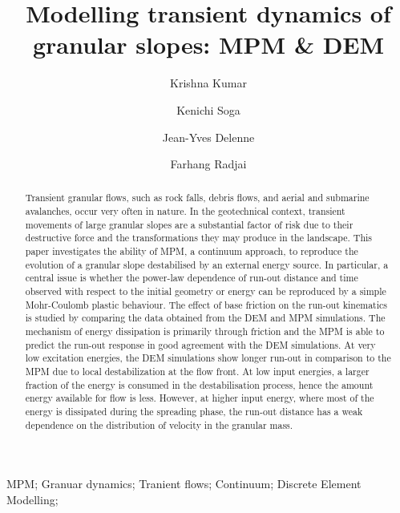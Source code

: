 \documentclass[3p,times,procedia,number]{elsarticle}
\begin{document}
\begin{frontmatter}



\title{Modelling transient dynamics of granular slopes: MPM \& DEM}

\author[a]{Krishna Kumar}
\author[a,b]{Kenichi Soga}
\author[c]{Jean-Yves Delenne}
\author[c,d]{Farhang Radjai}

\address[a]{Department of Engineering, University of Cambridge, Cambridge CB2
  1PZ, UK}
\address[b]{Department of Civil Engineering, University of California,
  Berkeley, USA}
\address[c]{University of Montpellier II, France}
\address[d]{Massachusetts Institute of Technology, Cambridge, USA}

\begin{abstract}
Transient granular flows, such as rock falls, debris flows, and aerial and
submarine avalanches, occur very often in nature. In the geotechnical
context, transient movements of large granular slopes are a substantial
factor of risk due to their destructive force and the transformations they
may produce in the landscape. This paper investigates the ability of MPM, a
continuum approach, to reproduce the evolution of a granular slope
destabilised by an external energy source. In particular, a central issue is
whether the power-law dependence of run-out distance and time observed with
respect to the initial geometry or energy can be reproduced by a simple
Mohr-Coulomb plastic behaviour. The effect of base 
friction on the run-out kinematics is studied by comparing the data obtained
from the DEM and MPM simulations. The mechanism of energy dissipation is
primarily through friction and the MPM is able to predict the run-out response in
good agreement with the DEM simulations. At very low excitation energies, 
the DEM simulations show longer run-out in comparison to the MPM due to local
destabilization at the flow front. At low input energies, a larger fraction of
the energy is consumed in the destabilisation process, hence the amount energy
available for flow is less. However, at higher input energy, where most of
the energy is dissipated during the spreading phase, the run-out distance 
has a weak dependence on the distribution of velocity in the granular mass.
\end{abstract}

\begin{keyword}
MPM; Granuar dynamics; Tranient flows; Continuum; 
Discrete Element Modelling;



\end{keyword}
\end{frontmatter}
\end{document}
